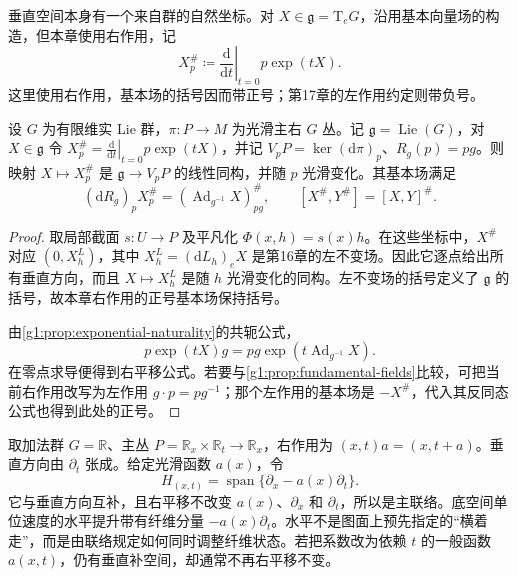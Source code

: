 \ProseParagraphBreak

垂直空间本身有一个来自群的自然坐标。对 \(X\in\mathfrak g=\mathrm{T}_eG\)，沿用基本向量场的构造，但本章使用右作用，记
\begin{equation}\label{g1:eq:principal-fundamental-field}
	X_p^\#\coloneqq\left.\frac{\mathrm{d}}{\mathrm{d}t}\right|_{t=0}p\exp(tX).
\end{equation}
这里使用右作用，基本场的括号因而带正号；第17章的左作用约定则带负号。

\begin{proposition}\label{g1:prop:principal-fundamental-fields}
	设 \(G\) 为有限维实 Lie 群，\(\pi:P\to M\) 为光滑主右 \(G\) 丛。记 \(\mathfrak g=\operatorname{Lie}(G)\)，对 \(X\in\mathfrak g\) 令 \(X_p^\#=\left.\frac{\mathrm{d}}{\mathrm{d}t}\right|_{t=0}p\exp(tX)\)，并记 \(V_pP=\ker(\mathrm{d}\pi)_p\)、\(R_g(p)=pg\)。则映射 \(X\mapsto X_p^\#\) 是 \(\mathfrak g\to V_pP\) 的线性同构，并随 \(p\) 光滑变化。其基本场满足
	\begin{equation}\label{g1:eq:principal-fundamental-identities}
		(\mathrm{d}R_g)_pX_p^\#=(\operatorname{Ad}_{g^{-1}}X)_{pg}^\#,
		\qquad [X^\#,Y^\#]=[X,Y]^\#.
	\end{equation}
\end{proposition}
\begin{proof}
	取局部截面 \(s:U\to P\) 及平凡化 \(\Phi(x,h)=s(x)h\)。在这些坐标中，\(X^\#\) 对应 \((0,X_h^L)\)，其中 \(X_h^L=(\mathrm{d}L_h)_eX\) 是第16章的左不变场。因此它逐点给出所有垂直方向，而且 \(X\mapsto X_h^L\) 是随 \(h\) 光滑变化的同构。左不变场的括号定义了 \(\mathfrak g\) 的括号，故本章右作用的正号基本场保持括号。

	由\cref{g1:prop:exponential-naturality}的共轭公式，
	\[
		p\exp(tX)g=pg\exp(t\operatorname{Ad}_{g^{-1}}X).
	\]
	在零点求导便得到右平移公式。若要与\cref{g1:prop:fundamental-fields}比较，可把当前右作用改写为左作用 \(g\cdot p=pg^{-1}\)；那个左作用的基本场是 \(-X^\#\)，代入其反同态公式也得到此处的正号。
\end{proof}

\begin{example}\label{g1:exm:horizontal-additive-bundle}
	取加法群 \(G=\mathbb R\)、主丛 \(P=\mathbb R_x\times\mathbb R_t\to\mathbb R_x\)，右作用为 \((x,t)a=(x,t+a)\)。垂直方向由 \(\partial_t\) 张成。给定光滑函数 \(a(x)\)，令
	\[
		H_{(x,t)}=\operatorname{span}\{\partial_x-a(x)\partial_t\}.
	\]
	它与垂直方向互补，且右平移不改变 \(a(x)\)、\(\partial_x\) 和 \(\partial_t\)，所以是主联络。底空间单位速度的水平提升带有纤维分量 \(-a(x)\partial_t\)。水平不是图面上预先指定的“横着走”，而是由联络规定如何同时调整纤维状态。若把系数改为依赖 \(t\) 的一般函数 \(a(x,t)\)，仍有垂直补空间，却通常不再右平移不变。
\end{example}

